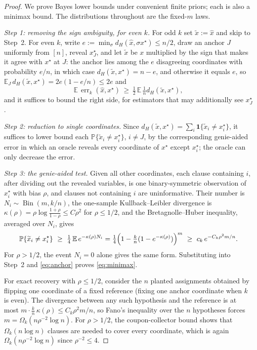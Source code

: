 \documentclass[11pt]{article}
\theoremstyle{definition}
\theoremstyle{remark}
\newcommand{\E}{\mathbb E}
\newcommand{\bbP}{\mathbb P}
\newcommand{\1}{\mathbf 1}
\newcommand{\xstar}{{x^\star}}
\DeclareMathOperator{\err}{err}
\numberwithin{equation}{section}
\begin{document}
\begin{proof}
We prove Bayes lower bounds under convenient finite priors; each is also
a minimax bound.  The distributions throughout are the fixed-$m$ laws.

\emph{Step 1: removing the sign ambiguity, for even $k$.}  For odd $k$
set $\widetilde x:=\widehat x$ and skip to Step~2.  For even $k$,
write $e:=\min_\sigma d_H(\widehat x,\sigma\xstar)\le n/2$, draw an
anchor $J$ uniformly from $[n]$, reveal $x_J^\star$, and let
$\widetilde x$ be $\widehat x$ multiplied by the sign that makes it
agree with $\xstar$ at $J$: the anchor lies among the $e$ disagreeing
coordinates with probability $e/n$, in which case
$d_H(\widetilde x,\xstar)=n-e$, and otherwise it equals $e$, so
$\E_J\,d_H(\widetilde x,\xstar)=2e(1-e/n)\le2e$ and
\begin{equation}\label{eq:anchor}
 \E\,\err_k(\widehat x,\xstar)
 \ \ge\ \tfrac12\,\E\,\tfrac1nd_H(\widetilde x,\xstar),
\end{equation}
and it suffices to bound the right side, for estimators that may
additionally see $x^\star_J$.

\emph{Step 2: reduction to single coordinates.}  Since
$d_H(\widetilde x,\xstar)=\sum_i\1\{\widetilde x_i\ne x_i^\star\}$, it
suffices to lower bound each
$\bbP\{\widetilde x_i\ne x_i^\star\}$, $i\ne J$, by the corresponding
genie-aided error in which an oracle reveals every coordinate of
$\xstar$ except $x_i^\star$; the oracle can only decrease the error.

\emph{Step 3: the genie-aided test.}  Given all other coordinates,
each clause containing $i$, after dividing out the revealed variables,
is one binary-symmetric observation of $x_i^\star$ with bias $\rho$,
and clauses not containing $i$ are uninformative.  Their number is
$N_i\sim\operatorname{Bin}(m,k/n)$, the one-sample Kullback--Leibler
divergence is
$\kappa(\rho)=\rho\log\frac{1+\rho}{1-\rho}\le C\rho^2$ for
$\rho\le1/2$, and the Bretagnolle--Huber inequality, averaged over
$N_i$, gives
\[
 \bbP\{\widetilde x_i\ne x_i^\star\}
 \ \ge\ \tfrac14\,\E\,e^{-\kappa(\rho)N_i}
 =\tfrac14\Bigl(1-\tfrac kn(1-e^{-\kappa(\rho)})\Bigr)^{m}
 \ \ge\ c_k\,e^{-C_k\rho^2m/n}.
\]
For $\rho>1/2$, the event $N_i=0$ alone gives the same form.
Substituting into Step~2 and \cref{eq:anchor} proves
\cref{eq:minimax}.

For exact recovery with $\rho\le1/2$, consider the $n$ planted
assignments obtained by flipping one coordinate of a fixed reference
(fixing one anchor coordinate when $k$ is even).  The divergence between
any such hypothesis and the reference is at most
$m\cdot\tfrac kn\,\kappa(\rho)\le C_k\rho^2m/n$, so Fano's inequality
over the $n$ hypotheses forces $m=\Omega_k(n\rho^{-2}\log n)$.  For
$\rho>1/2$, the coupon-collector bound shows that
$\Omega_k(n\log n)$ clauses are needed to cover every coordinate, which
is again $\Omega_k(n\rho^{-2}\log n)$ since $\rho^{-2}\le4$.
\end{proof}
\end{document}
